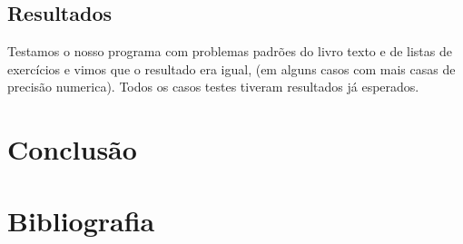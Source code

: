 \documentclass[a4paper]{article}
\begin{document}
\subsection{Resultados}
Testamos o nosso programa com problemas padrões do livro texto e de listas de exercícios e vimos que o resultado era igual, (em alguns casos com mais casas de precisão numerica). Todos os casos testes tiveram resultados já esperados.

\section{Conclusão}


\section{Bibliografia}


\end{document}
